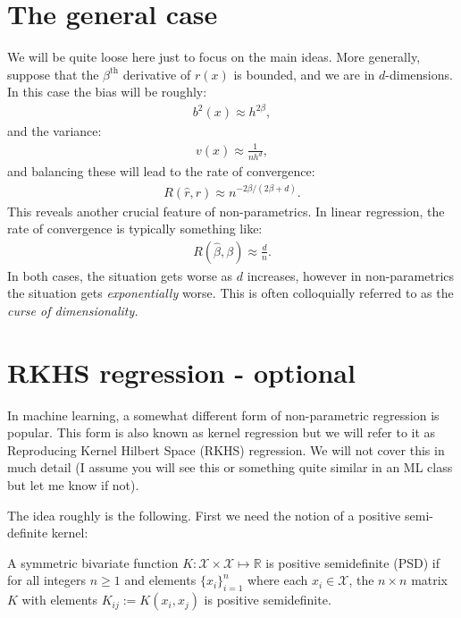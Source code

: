 \documentclass[twoside,12pt]{article}
\begin{document}
\section{The general case}
We will be quite loose here just to focus on the main ideas. 
More generally, suppose that the $\beta^{\mathrm{th}}$ derivative of $r(x)$ is 
bounded, and we are in $d$-dimensions. 
In this case the bias will be roughly:
\begin{align*}
b^2(x) \approx h^{2\beta},
\end{align*}
and the variance:
\begin{align*}
v(x) \approx \frac{1}{nh^d},
\end{align*}
and balancing these will lead to the rate of convergence:
\begin{align*}
R(\widehat{r},r) \approx n^{- 2\beta/ (2\beta + d)}.
\end{align*}
This reveals another crucial feature of non-parametrics. In linear regression, the
rate of convergence is typically something like:
\begin{align*}
R(\widehat{\beta},\beta) \approx \frac{d}{n}.
\end{align*}
In both cases, the situation gets worse as $d$ increases, however in non-parametrics the
situation gets \emph{exponentially} worse. This is often colloquially referred
to as the \emph{curse of dimensionality.}

\section{RKHS regression - optional}
In machine learning, a somewhat different form of non-parametric regression is popular. This form is also known as kernel regression but we will refer to it as Reproducing Kernel Hilbert Space (RKHS) regression. We will not cover this in much detail (I assume you will see this or something quite similar in an ML class but let me know if not).

The idea roughly is the following. First we need the notion of a positive semi-definite kernel:

A symmetric bivariate function $K: \mathcal{X} \times \mathcal{X} \mapsto \mathbb{R}$ is positive semidefinite (PSD) if for all integers $n \geq 1$ and elements $\{x_i\}_{i=1}^n$ where each $x_i \in \mathcal{X}$, the $n \times n$ matrix $K$ with elements $K_{ij} := K(x_i, x_j)$ is positive semidefinite.
\end{document}
